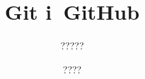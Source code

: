 \documentclass[10pt,t]{beamer}
\title{Git i~GitHub}
\subtitle{?????}
\author{????}
\date{}
\begin{document}





\RaggedRight





\maketitle





































\end{document}
